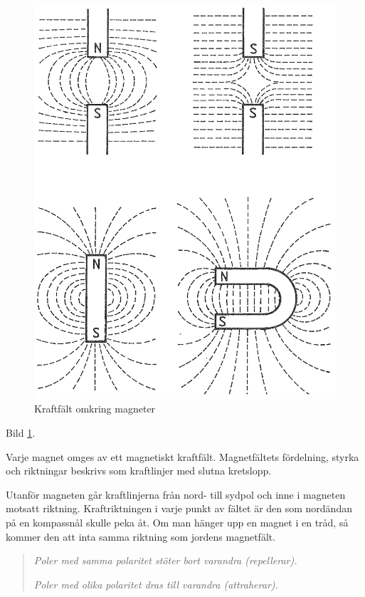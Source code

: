 \begin{figure}
  \includegraphics[width=\textwidth]{images/cropped_pdfs/bild_2_1-07.pdf}
  \caption{Kraftfält omkring magneter}
  \label{fig:BildII1-7}
\end{figure}

Bild \ref{fig:BildII1-7}.

Varje magnet omges av ett magnetiskt kraftfält. Magnetfältets fördelning,
styrka och riktningar beskrivs som kraftlinjer med slutna kretslopp.

Utanför magneten går kraftlinjerna från nord- till sydpol och inne i magneten
motsatt riktning. Kraftriktningen i varje punkt av fältet är den som nordändan
på en kompassnål skulle peka åt. Om man hänger upp en magnet i en tråd, så
kommer den att inta samma riktning som jordens magnetfält.

\begin{quote}
\emph{Poler med samma polaritet stöter bort varandra (repellerar).}

\emph{Poler med olika polaritet dras till varandra (attraherar).}
\end{quote}

